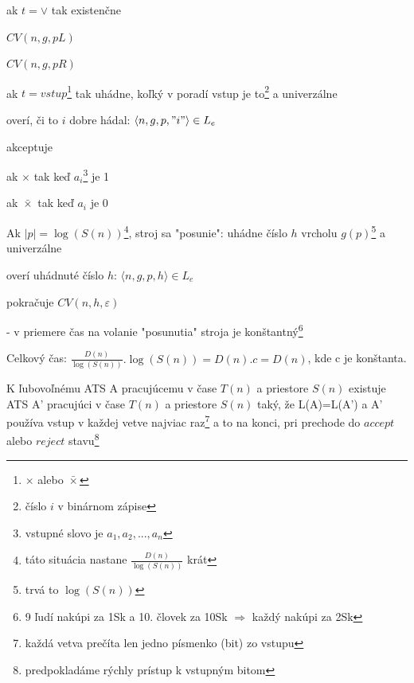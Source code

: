 \begin{dokaz}
\begin{description}
\begin{enumerate}
\begin{description}
\begin{description}
\end{description}
\item ak $t=\vee$ tak existenčne
\begin{description}
\item $CV(n,g,pL)$
\item $CV(n,g,pR)$
\end{description}
\item ak $t=vstup$\footnote{$\times$ alebo $\bar{\times}$} tak uhádne, koľký v poradí
vstup je to\footnote{číslo $i$ v binárnom zápise} a univerzálne
\begin{description}
\item overí, či to $i$ dobre hádal: $\langle n,g,p,"i"\rangle \in L_e$
\item akceptuje
\begin{description}
\item ak $\times$ tak keď $a_i$\footnote{vstupné slovo je $a_1,a_2,...,a_n$} je 1
\item ak $\bar{\times}$ tak keď $a_i$ je 0
\end{description}
\end{description}
\end{description}
\end{enumerate}
Ak $|p|=\log(S(n))$\footnote{táto situácia nastane $\frac{D(n)}{\log(S(n))}$ krát}, stroj
sa "posunie": uhádne číslo $h$ vrcholu $g(p)$\footnote{trvá to $\log(S(n))$} a
univerzálne
\begin{description}
\item overí uhádnuté číslo $h$: $\langle n,g,p,h \rangle \in L_e$
\item pokračuje $CV(n,h,\varepsilon)$
\end{description}
- v priemere čas na volanie "posunutia" stroja je konštantný\footnote{9 ľudí nakúpi za
1Sk a 10. človek za 10Sk $\Rightarrow$ každý nakúpi za 2Sk}
\end{description}
Celkový čas: $\frac{D(n)}{\log(S(n))}.\log(S(n)) = D(n).c=D(n)$, kde c je konštanta.
\end{dokaz}

\begin{lema}
K ľubovoľnému ATS A pracujúcemu v čase $T(n)$ a priestore $S(n)$ existuje ATS A'
pracujúci v čase $T(n)$ a priestore $S(n)$ taký, že L(A)=L(A') a A' používa vstup v
každej vetve najviac raz\footnote{každá vetva prečíta len jedno písmenko (bit) zo vstupu}
a to na konci, pri prechode do $accept$ alebo $reject$ stavu\footnote{predpokladáme
rýchly prístup k vstupným bitom}
\end{lema}

